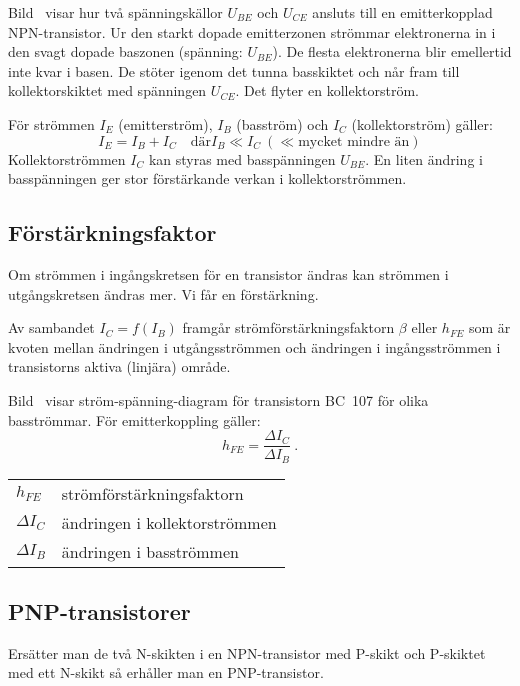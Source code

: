 Bild~ visar hur två spänningskällor \(U_{BE}\) och
\(U_{CE}\) ansluts till en emitterkopplad NPN-transistor.
Ur den starkt dopade emitterzonen strömmar elektronerna in i den svagt dopade
baszonen (spänning: \(U_{BE}\)).
De flesta elektronerna blir emellertid inte kvar i basen.
De stöter igenom det tunna basskiktet och når fram till
kollektorskiktet med spänningen \(U_{CE}\). Det flyter en kollektorström.

För strömmen \(I_E\) (emitterström), \(I_B\) (basström) och \(I_C\)
(kollektorström) gäller:
\[I_E = I_B + I_C\quad \text{där} I_B \ll I_C\ (\ll \text{mycket mindre än})\]
Kollektorströmmen \(I_C\) kan styras med basspänningen \(U_{BE}\).
En liten ändring i basspänningen ger stor förstärkande verkan i
kollektorströmmen.

\subsection{Förstärkningsfaktor}
\label{transistor_förstärkningsfaktor}

Om strömmen i ingångskretsen för en transistor ändras kan strömmen i
utgångskretsen ändras mer.
Vi får en förstärkning.

Av sambandet \(I_C = f(I_B)\) framgår strömförstärkningsfaktorn \(\beta\) eller
\(h_{FE}\) som är kvoten mellan ändringen i utgångsströmmen och ändringen i
ingångsströmmen i transistorns aktiva (linjära) område.

Bild~ visar ström-spänning-diagram för transistorn BC~107
för olika basströmmar.
För emitterkoppling gäller:
\[h_{FE} = \dfrac{\Delta I_C}{\Delta I_B}~.\]
\begin{tabular}{ll}
  \(h_{FE}\) & strömförstärkningsfaktorn \\
  \(\Delta I_C\)   & ändringen i kollektorströmmen \\
  \(\Delta I_B\)   & ändringen i basströmmen \\
\end{tabular}

\subsection{PNP-transistorer}
\label{transistor_pnp}

Ersätter man de två N-skikten i en NPN-transistor med P-skikt och P-skiktet med
ett N-skikt så erhåller man en PNP-transistor.

